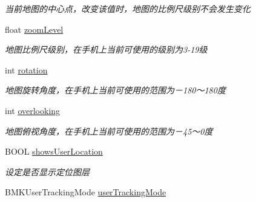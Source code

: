 \begin{DoxyCompactItemize}
\begin{DoxyCompactList}\small\item\em 当前地图的中心点，改变该值时，地图的比例尺级别不会发生变化 \end{DoxyCompactList}\item 
\hypertarget{interface_b_m_k_map_view_a5e6c1e21fddd4d6a24194be53f14c27e}{float \hyperlink{interface_b_m_k_map_view_a5e6c1e21fddd4d6a24194be53f14c27e}{zoom\-Level}}\label{interface_b_m_k_map_view_a5e6c1e21fddd4d6a24194be53f14c27e}

\begin{DoxyCompactList}\small\item\em 地图比例尺级别，在手机上当前可使用的级别为3-\/19级 \end{DoxyCompactList}\item 
\hypertarget{interface_b_m_k_map_view_a344d3d4be5d00adfc22feaa2ab6869c4}{int \hyperlink{interface_b_m_k_map_view_a344d3d4be5d00adfc22feaa2ab6869c4}{rotation}}\label{interface_b_m_k_map_view_a344d3d4be5d00adfc22feaa2ab6869c4}

\begin{DoxyCompactList}\small\item\em 地图旋转角度，在手机上当前可使用的范围为－180～180度 \end{DoxyCompactList}\item 
\hypertarget{interface_b_m_k_map_view_a8ae6f6cf221ea4f14923150d8974f997}{int \hyperlink{interface_b_m_k_map_view_a8ae6f6cf221ea4f14923150d8974f997}{overlooking}}\label{interface_b_m_k_map_view_a8ae6f6cf221ea4f14923150d8974f997}

\begin{DoxyCompactList}\small\item\em 地图俯视角度，在手机上当前可使用的范围为－45～0度 \end{DoxyCompactList}\item 
\hypertarget{interface_b_m_k_map_view_af0b1358b03cf2e760d58c96dc50d3ebe}{B\-O\-O\-L \hyperlink{interface_b_m_k_map_view_af0b1358b03cf2e760d58c96dc50d3ebe}{shows\-User\-Location}}\label{interface_b_m_k_map_view_af0b1358b03cf2e760d58c96dc50d3ebe}

\begin{DoxyCompactList}\small\item\em 设定是否显示定位图层 \end{DoxyCompactList}\item 
\hypertarget{interface_b_m_k_map_view_a509e86ec239b61f838bd7c686940f68e}{B\-M\-K\-User\-Tracking\-Mode \hyperlink{interface_b_m_k_map_view_a509e86ec239b61f838bd7c686940f68e}{user\-Tracking\-Mode}}\label{interface_b_m_k_map_view_a509e86ec239b61f838bd7c686940f68e}


\end{DoxyCompactItemize}
